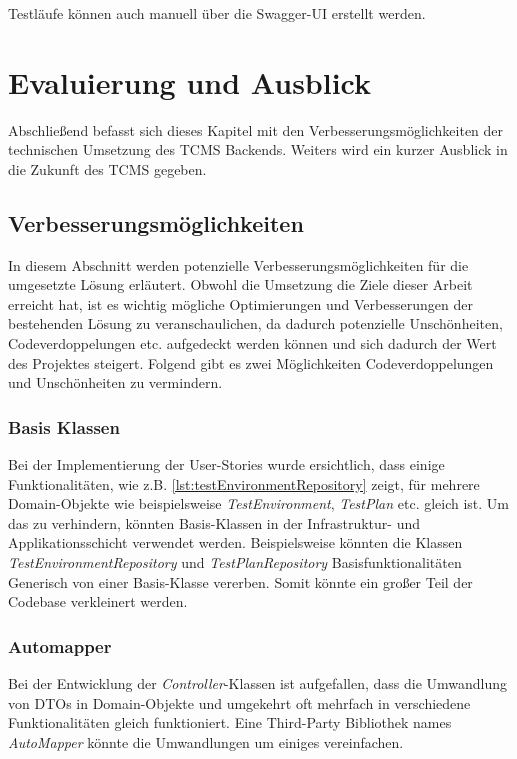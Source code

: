 \documentclass[a4paper, fontsize=11pt, parskip=half, twoside]{scrreprt}
\begin{document}
	Testläufe können auch manuell über die Swagger-UI erstellt werden.
	
	\chapter{Evaluierung und Ausblick}
	Abschließend befasst sich dieses Kapitel mit den Verbesserungsmöglichkeiten der technischen Umsetzung des \ac{TCMS} Backends.
	Weiters wird ein kurzer Ausblick in die Zukunft des \ac{TCMS} gegeben.
	
	\section{Verbesserungsmöglichkeiten}
	In diesem Abschnitt werden potenzielle Verbesserungsmöglichkeiten für die umgesetzte Lösung erläutert.
	Obwohl die Umsetzung die Ziele dieser Arbeit erreicht hat, ist es wichtig mögliche Optimierungen und Verbesserungen der bestehenden Lösung zu veranschaulichen, da dadurch potenzielle Unschönheiten, Codeverdoppelungen etc. aufgedeckt werden können und sich dadurch der Wert des Projektes steigert.
	Folgend gibt es zwei Möglichkeiten Codeverdoppelungen und Unschönheiten zu vermindern.

	\subsection{Basis Klassen}
	Bei der Implementierung der User-Stories wurde ersichtlich, dass einige Funktionalitäten, wie z.B. \autoref{lst:testEnvironmentRepository} zeigt, für mehrere Domain-Objekte wie beispielsweise \emph{TestEnvironment}, \emph{TestPlan} etc. gleich ist.
	Um das zu verhindern, könnten Basis-Klassen in der Infrastruktur- und Applikationsschicht verwendet werden.
	Beispielsweise könnten die Klassen \emph{TestEnvironmentRepository} und \emph{TestPlanRepository} Basisfunktionalitäten Generisch von einer Basis-Klasse vererben.
	Somit könnte ein großer Teil der Codebase verkleinert werden.
	
	\subsection{Automapper}
	Bei der Entwicklung der \emph{Controller}-Klassen ist aufgefallen, dass die Umwandlung von \ac{DTO}s in Domain-Objekte und umgekehrt oft mehrfach in verschiedene Funktionalitäten gleich funktioniert.
	Eine Third-Party Bibliothek names \emph{AutoMapper} könnte die Umwandlungen um einiges vereinfachen. \textcite{noauthor_automapper_nodate}
	
\end{document}
